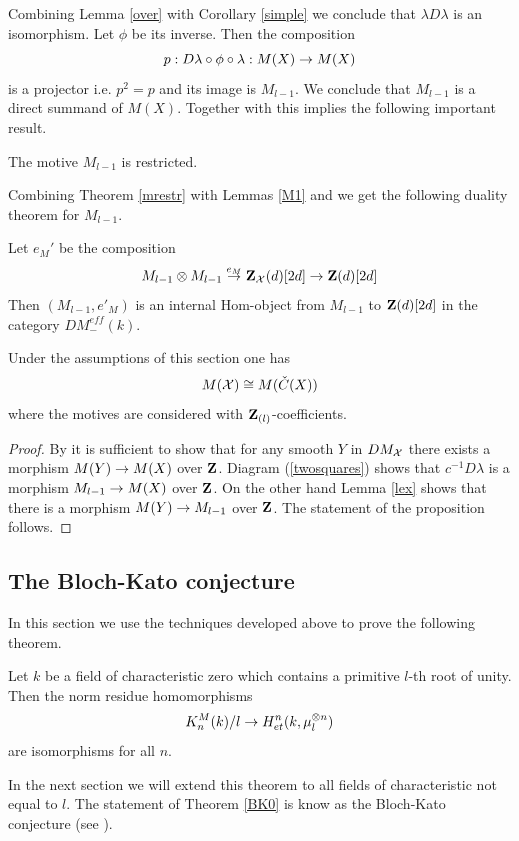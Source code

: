 \documentclass[11pt]{article}
\begin{document}
%
Combining Lemma \ref{over} with Corollary \ref{simple} we conclude
that $\lambda D\lambda$ is an isomorphism. Let $\phi$ be its
inverse. Then the composition 
%
$$p:D\lambda\circ \phi\circ \lambda:M(X)\rightarrow
M(X)$$
%
is a projector i.e. $p^2=p$ and its image is $M_{l-1}$. We conclude
that $M_{l-1}$ is a direct summand of $M(X)$. Together with 
 this implies the following important result.
%
\begin{theorem}
The motive $M_{l-1}$ is restricted.
\end{theorem}
%
Combining Theorem \ref{mrestr} with Lemmas \ref{M1} and 
we get the following duality theorem for $M_{l-1}$.
%
\begin{cor}
Let $e_M'$ be the composition
%
$$M_{l-1}\otimes M_{l-1}\stackrel{e_M}{\rightarrow} {\bf Z\rm}_{\cal X}(d)[2d]\rightarrow
{\bf Z\rm}(d)[2d]$$
%
Then $(M_{l-1},e'_M)$ is an internal Hom-object from $M_{l-1}$ to
${\bf Z\rm}(d)[2d]$ in the category $DM^{eff}_{-}(k)$.
\end{cor}
%
\begin{proposition}
Under the assumptions of this section one has 
%
$$M({\cal X})\cong M(\check{C}(X))$$
%
where the motives are considered with ${\bf Z\rm}_{(l)}$-coefficients.
\end{proposition}
%
\begin{proof}
By  it is sufficient to show that for any smooth $Y$ in
$DM_{\cal X}$ there exists a morphism $M(Y)\rightarrow M(X)$ over
${\bf Z\rm}$. Diagram (\ref{twosquares}) shows that $c^{-1}D\lambda$ is a
morphism $M_{l-1}\rightarrow M(X)$ over ${\bf Z\rm}$. On the other hand Lemma
\ref{lex} shows that there
is a morphism $M(Y)\rightarrow M_{l-1}$ over ${\bf Z\rm}$. The statement of the
proposition follows.
\end{proof}
%


























\subsection{The Bloch-Kato conjecture}
%
In this section we use the techniques developed above to prove the
following theorem.
%
\begin{theorem}
Let $k$ be a field of characteristic zero which contains a primitive
$l$-th root of unity. Then the norm residue homomorphisms
%
$$K_n^M(k)/l\rightarrow H^n_{et}(k,\mu_l^{\otimes n})$$
%
are isomorphisms for all $n$.
\end{theorem}
%
In the next section we will extend this theorem to all fields of 
characteristic not equal to $l$. The statement of Theorem \ref{BK0} is
know as the Bloch-Kato conjecture (see \cite{MCpub}).
\end{document}
